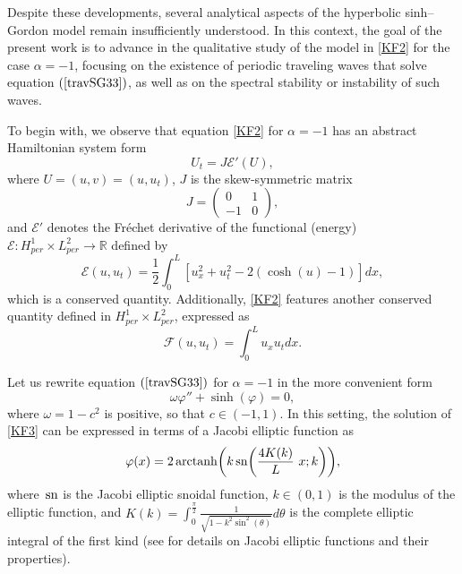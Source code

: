 \documentclass[12pt,reqno,a4paper]{amsart} %
\newcommand{\sn}{{\rm \,sn}}
\numberwithin{equation}{section}
\numberwithin{figure}{section}
\begin{document}
Despite these developments, several analytical aspects of the hyperbolic sinh–Gordon model remain insufficiently understood. In this context, the goal of the present work is to advance in the qualitative study of the model in \eqref{KF2} for the case $\alpha = -1$, focusing on the existence of periodic traveling waves that solve equation $(\ref{travSG33})$, as well as on the spectral stability or instability of such waves.
 
 To begin with, we observe that equation \eqref{KF2} for $\alpha=-1$ has an abstract Hamiltonian system form
\begin{equation}\label{hamilt31}
U_t=J \mathcal{E}'(U),
\end{equation}   where $U=(u,v)=(u,u_t)$, $J$ is the skew-symmetric matrix
\begin{equation}\label{J}
J=\left(
\begin{array}{cc}
 0 & 1\\
-1 & 0\end{array}
\right),
\end{equation}and $\mathcal{E}'$ denotes the Fr\'echet derivative of the functional (energy) $\mathcal{E}:H^1_{per}\times L^2_{per} \rightarrow \mathbb{R}$ defined by  
\begin{equation}\label{E}
	\mathcal{E}(u, u_t)
=\displaystyle\frac{1}{2}\int_{0}^{L} \left[u_x^2+u_t^2-2(\cosh(u)-1)\right] dx,
\end{equation}
which is a conserved quantity. Additionally, \eqref{KF2} features another conserved quantity defined in $H^1_{per}\times L^2_{per}$, expressed as
\begin{equation}\label{F}
	\mathcal{F}(u,u_t)=\displaystyle\int_{0}^{L}u_x u_t  dx.
\end{equation}
 
 Let us rewrite equation $(\ref{travSG33})$ for $\alpha = -1$ in the more convenient form
\begin{equation}\label{KF3}
\omega \varphi'' + \sinh(\varphi) = 0,
\end{equation}
where $\omega = 1 - c^{2}$ is positive, so that $c \in (-1,1)$. In this setting, the solution of \eqref{KF3} can be expressed in terms of a Jacobi elliptic function as
\begin{equation}\label{Sol2}
\varphi(x) = 2\operatorname{arctanh}\biggl(k\sn\biggl(\frac{4K(k)}{L} \  x ; k\biggr)\biggr),
\end{equation}
where $\sn$ is the Jacobi elliptic snoidal function, $k \in (0,1)$ is the modulus of the elliptic function, and $K(k)=\displaystyle\int_{0}^{\frac{\pi}{2}}\frac{1}{\sqrt{1-k^2\sin^2(\theta)}}d\theta$ is the complete elliptic integral of the first kind (see \cite{byrd} for details on Jacobi elliptic functions and their properties).
\end{document}
